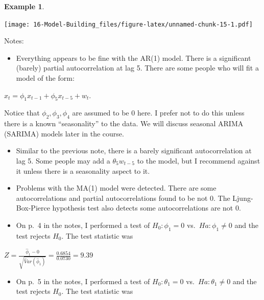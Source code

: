 \documentclass[
]{book}
\newenvironment{Shaded}{\begin{snugshade}}{\end{snugshade}}
\newcommand{\AttributeTok}[1]{\textcolor[rgb]{0.77,0.63,0.00}{#1}}
\newcommand{\DecValTok}[1]{\textcolor[rgb]{0.00,0.00,0.81}{#1}}
\newcommand{\FunctionTok}[1]{\textcolor[rgb]{0.00,0.00,0.00}{#1}}
\newcommand{\NormalTok}[1]{#1}
\newcommand{\SpecialCharTok}[1]{\textcolor[rgb]{0.00,0.00,0.00}{#1}}
\newcommand{\StringTok}[1]{\textcolor[rgb]{0.31,0.60,0.02}{#1}}
\providecommand{\tightlist}{%
  \setlength{\itemsep}{0pt}\setlength{\parskip}{0pt}}
\theoremstyle{definition}
\theoremstyle{definition}
\newtheorem{example}{Example}[chapter]
\theoremstyle{definition}
\theoremstyle{definition}
\theoremstyle{remark}
\begin{document}
\begin{example}
\begin{Shaded}
\end{Shaded}

\texttt{[image: 16-Model-Building\_files/figure-latex/unnamed-chunk-15-1.pdf]}
\end{example}

Notes:

\begin{itemize}
\tightlist
\item
  Everything appears to be fine with the AR(1) model. There is a significant (barely) partial autocorrelation at lag 5. There are some people who will fit a model of the form:
\end{itemize}

\(x_t = \phi_1x_{t-1} + \phi_5x_{t-5} + w_t.\)

Notice that \(\phi_2, \phi_3, \phi_4\) are assumed to be 0 here. I prefer not to do this unless there is a known ``seasonality'' to the data. We will discuss seasonal ARIMA (SARIMA) models later in the course.

\begin{itemize}
\tightlist
\item
  Similar to the previous note, there is a barely significant autocorrelation at lag 5. Some people may add a \(\theta_5w_{t-5}\) to the model, but I recommend against it unless there is a seasonality aspect to it.
\item
  Problems with the MA(1) model were detected. There are some autocorrelations and partial autocorrelations found to be not 0. The Ljung-Box-Pierce hypothesis test also detects some autocorrelations are not 0.\\
\item
  On p.~4 in the notes, I performed a test of \(H_0:\phi_1=0\) vs.~\(Ha:\phi_1\ne 0\) and the test rejects \(H_0\). The test statistic was
\end{itemize}

\(Z=\frac{\hat \phi_1-0}{\sqrt{\hat Var(\hat \phi_1)}}=\frac{0.6854}{0.0730}=9.39\)

\begin{itemize}
\tightlist
\item
  On p.~5 in the notes, I performed a test of \(H_0:\theta_1=0\) vs.~\(Ha:\theta_1\ne 0\) and the test rejects \(H_0\). The test statistic was
\end{itemize}
\end{document}
